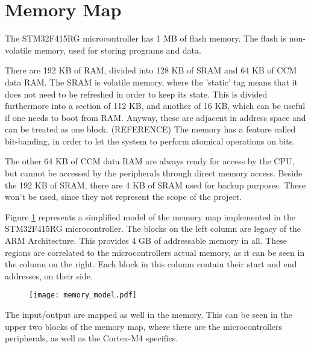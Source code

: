\section{Memory Map}
\label{sec:memory_map}
The STM32F415RG microcontroller has 1 MB of flash memory. The flash 
is non-volatile memory, used for storing programs and
data.

There are 192 KB of RAM, divided into 128 KB of SRAM and 64 KB of 
CCM data RAM.
The SRAM is volatile memory, where the 'static' tag means 
that it does not need to be refreshed in order to
keep its state. This is divided furthermore into a section of 112 KB, and 
another of 16 KB, which can be useful if one needs to boot from RAM. Anyway, these are adjacent in address space and can be treated as 
one block. (REFERENCE)
The memory has a feature called bit-banding, in order to let the system
to perform atomical operations on bits.

The other 64 KB of CCM data RAM are always ready for access by the CPU,
but cannot be accessed by the peripherals through direct memory access.
Beside the 192 KB of SRAM, there are 4 KB of SRAM used for backup purposes.
These won't be used, since they not represent the scope of the project.

Figure \ref{fig:memory_model} represents a simplified model of the 
memory map implemented in the STM32F415RG microcontroller. The blocks
on the left column are legacy of the ARM Architecture. This provides 
4 GB of addressable memory in all.
These regions are correlated to the microcontroller\textquotesingle s
actual memory, as it can be seen in the column on the right. Each block
in this column contain their start and end addresses, on their side.
\begin{figure}[H]
\centering
\texttt{[image: memory\_model.pdf]}
\label{fig:memory_model}
\end{figure}

The input/output are mapped as well in the memory. This can be seen in
the upper two blocks of the memory map, where there are the 
microcontroller\textquotesingle s peripherals, as well as the Cortex-M4
specifics.


